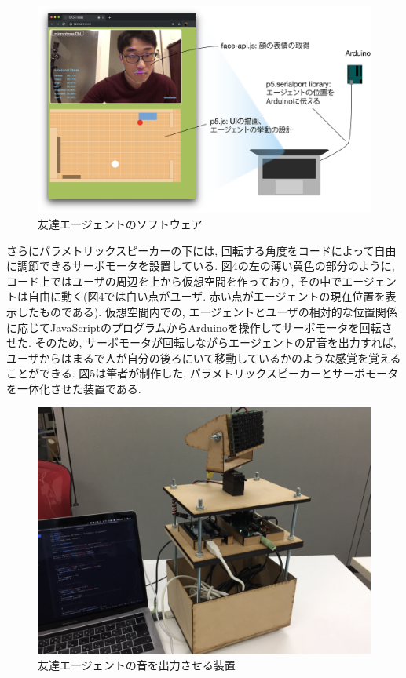 \documentclass[a4paper,dvipdfmx]{hisken}
\begin{document}
\begin{enumerate}
\begin{figure}
  \includegraphics[width=\linewidth]{IntimaterAgent_software.png}
  \caption{友達エージェントのソフトウェア}
  \label{fig:detection}
\end{figure}

さらにパラメトリックスピーカーの下には, 回転する角度をコードによって自由に調節できるサーボモータを設置している. 図4の左の薄い黄色の部分のように, コード上ではユーザの周辺を上から仮想空間を作っており, その中でエージェントは自由に動く(図4では白い点がユーザ. 赤い点がエージェントの現在位置を表示したものである). 仮想空間内での, エージェントとユーザの相対的な位置関係に応じてJavaScriptのプログラムからArduinoを操作してサーボモータを回転させた. そのため, サーボモータが回転しながらエージェントの足音を出力すれば, ユーザからはまるで人が自分の後ろにいて移動しているかのような感覚を覚えることができる. 図5は筆者が制作した, パラメトリックスピーカーとサーボモータを一体化させた装置である. 

\begin{figure}
  \includegraphics[width=\linewidth]{Speaker.png}
  \caption{友達エージェントの音を出力させる装置}
  \label{fig:Speaker}
\end{figure}



\end{enumerate}
\end{document}
